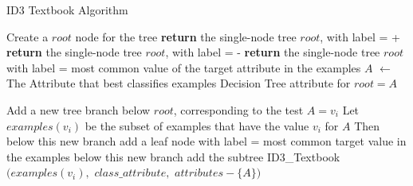 \begin{algorithm}[H]
\caption{ID3 Textbook Algorithm}\label{a:id3-simple}
\begin{algorithmic}[1]

    \State Create a $root$ node for the tree
        \State \textbf{return} the single-node tree $root$, with label = +
        \State \textbf{return} the single-node tree $root$, with label = -
        \State \textbf{return} the single-node tree $root$ with label = most common value of the target attribute in the examples
    \Else
        \State $A$ $\gets$ The Attribute that best classifies examples
        \State Decision Tree attribute for $root = A$

            \State Add a new tree branch below $root$, corresponding to the test $A = v_i$
            \State Let $examples(v_i)$ be the subset of examples that have the value $v_i$ for $A$
                \State Then below this new branch add a leaf node with label = most common target value in the examples
            \Else
                \State below this new branch add the subtree ID3\_Textbook$(examples(v_i),$ $class\_attribute,$ $attributes - \{A\})$
            \EndIf
        \EndFor
    \EndIf
\EndProcedure

\end{algorithmic}
\end{algorithm}



